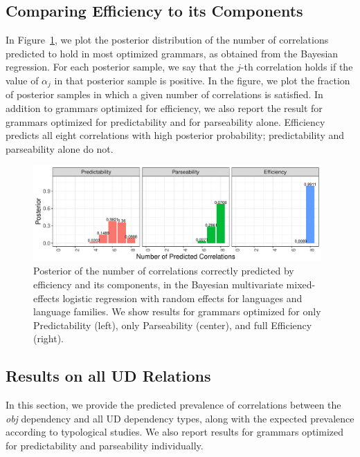 \documentclass[10pt,twoside,lineno]{article}
\begin{document}
\subsection{Comparing Efficiency to its Components}\label{sec:posterior-number}


In Figure~\ref{fig:posterior}, we plot the posterior distribution of the number of correlations predicted to hold in most optimized grammars, as obtained from the Bayesian regression.
For each posterior sample, we say that the $j$-th correlation holds if the value of $\alpha_j$ in that posterior sample is positive.
In the figure, we plot the fraction of posterior samples in which a given number of correlations is satisfied.
In addition to grammars optimized for efficiency, we also report the result for grammars optimized for predictability and for parseability alone.
Efficiency predicts all eight correlations with high posterior probability; predictability and parseability alone do not.

\begin{figure}[ht]
	\begin{center}
	\includegraphics[width=0.98\textwidth]{../results/correlations/figures/posterior-satisfied-universals-together-large-three.pdf}
	\end{center}
	\caption{Posterior of the number of correlations correctly predicted by efficiency and its components, in the Bayesian multivariate mixed-effects logistic regression with random effects for languages and language families. We show results for grammars optimized for only Predictability (left), only Parseability (center), and full Efficiency (right).}\label{fig:posterior}
\end{figure}




\subsection{Results on all UD Relations}
In this section, we provide the predicted prevalence of correlations between the \emph{obj} dependency and all UD dependency types, along with the expected prevalence according to typological studies.
We also report results for grammars optimized for predictability and parseability individually.
\end{document}
